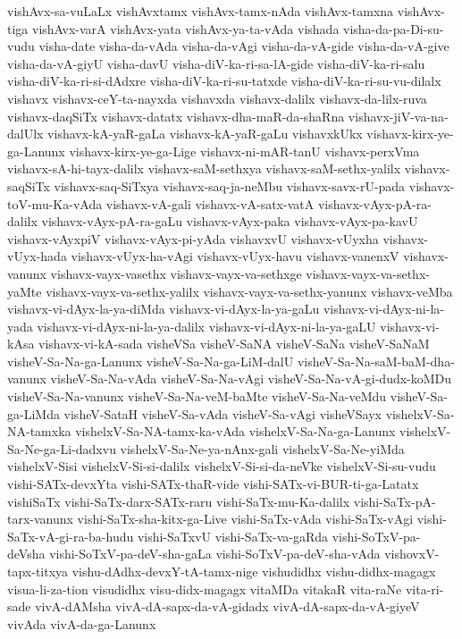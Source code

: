 {vishAvx-sa-vuLaLx
vishAvxtamx
vishAvx-tamx-nAda
vishAvx-tamxna
vishAvx-tiga
vishAvx-varA
vishAvx-yata
vishAvx-ya-ta-vAda
vishada
visha-da-pa-Di-su-vudu
visha-date
visha-da-vAda
visha-da-vAgi
visha-da-vA-gide
visha-da-vA-give
visha-da-vA-giyU
visha-davU
visha-diV-ka-ri-sa-lA-gide
visha-diV-ka-ri-salu
visha-diV-ka-ri-si-dAdxre
visha-diV-ka-ri-su-tatxde
visha-diV-ka-ri-su-vu-dilalx
vishavx
vishavx-ceY-ta-nayxda
vishavxda
vishavx-dalilx
vishavx-da-lilx-ruva
vishavx-daqSiTx
vishavx-datatx
vishavx-dha-maR-da-shaRna
vishavx-jiV-va-na-dalUlx
vishavx-kA-yaR-gaLa
vishavx-kA-yaR-gaLu
vishavxkUkx
vishavx-kirx-ye-ga-Lanunx
vishavx-kirx-ye-ga-Lige
vishavx-ni-mAR-tanU
vishavx-perxVma
vishavx-sA-hi-tayx-dalilx
vishavx-saM-sethxya
vishavx-saM-sethx-yalilx
vishavx-saqSiTx
vishavx-saq-SiTxya
vishavx-saq-ja-neMbu
vishavx-savx-rU-pada
vishavx-toV-mu-Ka-vAda
vishavx-vA-gali
vishavx-vA-satx-vatA
vishavx-vAyx-pA-ra-dalilx
vishavx-vAyx-pA-ra-gaLu
vishavx-vAyx-paka
vishavx-vAyx-pa-kavU
vishavx-vAyxpiV
vishavx-vAyx-pi-yAda
vishavxvU
vishavx-vUyxha
vishavx-vUyx-hada
vishavx-vUyx-ha-vAgi
vishavx-vUyx-havu
vishavx-vanenxV
vishavx-vanunx
vishavx-vayx-vasethx
vishavx-vayx-va-sethxge
vishavx-vayx-va-sethx-yaMte
vishavx-vayx-va-sethx-yalilx
vishavx-vayx-va-sethx-yanunx
vishavx-veMba
vishavx-vi-dAyx-la-ya-diMda
vishavx-vi-dAyx-la-ya-gaLu
vishavx-vi-dAyx-ni-la-yada
vishavx-vi-dAyx-ni-la-ya-dalilx
vishavx-vi-dAyx-ni-la-ya-gaLU
vishavx-vi-kAsa
vishavx-vi-kA-sada
visheVSa
visheV-SaNA
visheV-SaNa
visheV-SaNaM
visheV-Sa-Na-ga-Lanunx
visheV-Sa-Na-ga-LiM-dalU
visheV-Sa-Na-saM-baM-dha-vanunx
visheV-Sa-Na-vAda
visheV-Sa-Na-vAgi
visheV-Sa-Na-vA-gi-dudx-koMDu
visheV-Sa-Na-vanunx
visheV-Sa-Na-veM-baMte
visheV-Sa-Na-veMdu
visheV-Sa-ga-LiMda
visheV-SataH
visheV-Sa-vAda
visheV-Sa-vAgi
visheVSayx
vishelxV-Sa-NA-tamxka
vishelxV-Sa-NA-tamx-ka-vAda
vishelxV-Sa-Na-ga-Lanunx
vishelxV-Sa-Ne-ga-Li-dadxvu
vishelxV-Sa-Ne-ya-nAnx-gali
vishelxV-Sa-Ne-yiMda
vishelxV-Sisi
vishelxV-Si-si-dalilx
vishelxV-Si-si-da-neVke
vishelxV-Si-su-vudu
vishi-SATx-devxYta
vishi-SATx-thaR-vide
vishi-SATx-vi-BUR-ti-ga-Latatx
vishiSaTx
vishi-SaTx-darx-SATx-raru
vishi-SaTx-mu-Ka-dalilx
vishi-SaTx-pA-tarx-vanunx
vishi-SaTx-sha-kitx-ga-Live
vishi-SaTx-vAda
vishi-SaTx-vAgi
vishi-SaTx-vA-gi-ra-ba-hudu
vishi-SaTxvU
vishi-SaTx-va-gaRda
vishi-SoTxV-pa-deVsha
vishi-SoTxV-pa-deV-sha-gaLa
vishi-SoTxV-pa-deV-sha-vAda
vishovxV-tapx-titxya
vishu-dAdhx-devxY-tA-tamx-nige
vishudidhx
vishu-didhx-magagx
visua-li-za-tion
visudidhx
visu-didx-magagx
vitaMDa
vitakaR
vita-raNe
vita-ri-sade
vivA-dAMsha
vivA-dA-sapx-da-vA-gidadx
vivA-dA-sapx-da-vA-giyeV
vivAda
vivA-da-ga-Lanunx
}
